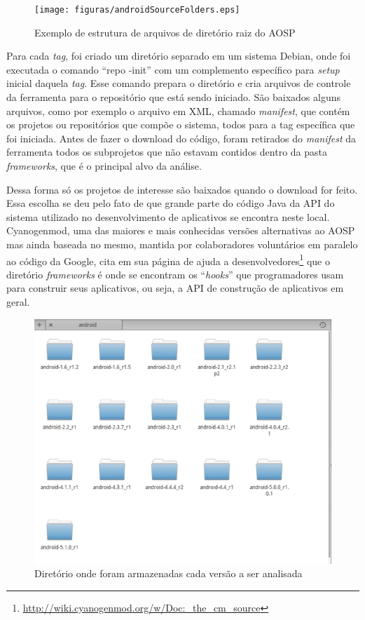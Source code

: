\begin{figure}[!htb]
\centering
\texttt{[image: figuras/androidSourceFolders.eps]}
\caption{Exemplo de estrutura de arquivos de diretório raiz do AOSP}
\label{androidSourceFolders}
\end{figure}

Para cada \textit{tag}, foi criado um diretório separado em um sistema Debian, onde foi executada o comando ``repo -init'' com um complemento específico para \textit{setup} inicial daquela \textit{tag}. Esse comando prepara o diretório e cria arquivos de controle da ferramenta para o repositório que está sendo iniciado. São baixados alguns arquivos, como por exemplo o arquivo em XML, chamado \textit{manifest}, que contém os projetos ou repositórios que compõe o sistema, todos para a tag específica que foi iniciada. Antes de fazer o download do código, foram retirados do \textit{manifest} da ferramenta todos os subprojetos que não estavam contidos dentro da pasta \textit{frameworks}, que é o principal alvo da análise. 

Dessa forma só os projetos de interesse são baixados quando o download for feito. Essa escolha se deu pelo fato de que grande parte do código Java da API do sistema utilizado no desenvolvimento de aplicativos se encontra neste local. Cyanogenmod, uma das maiores e mais conhecidas versões alternativas ao AOSP mas ainda baseada no mesmo, mantida por colaboradores voluntários em paralelo ao código da Google, cita em sua página de ajuda a desenvolvedores\footnote{\url{http://wiki.cyanogenmod.org/w/Doc:_the_cm_source}}  que o diretório \textit{frameworks} é onde se encontram os ``\textit{hooks}'' que programadores usam para construir seus aplicativos, ou seja, a API de construção de aplicativos em geral. 

\begin{figure}[!htb]
\centering
\includegraphics [keepaspectratio=true,scale=0.35]{figuras/folder.eps}
\caption{Diretório onde foram armazenadas cada versão a ser analisada}
\label{folder}
\end{figure}

